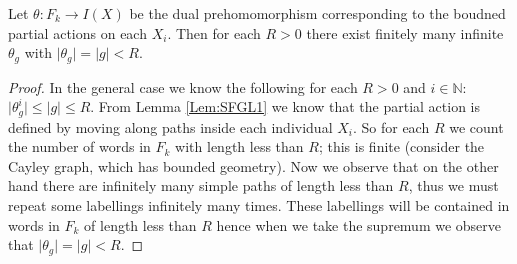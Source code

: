 \begin{proposition}\label{Prop:Inf}
Let $\theta: F_{k} \rightarrow I(X)$ be the dual prehomomorphism corresponding to the boudned partial actions on each $X_{i}$. Then for each $R>0$ there exist finitely many infinite $\theta_{g}$ with $\vert \theta_{g} \vert = \vert g \vert < R$. 
\end{proposition}
\begin{proof}

In the general case we know the following for each $R>0$ and $i \in \mathbb{N}$: $\vert \theta_{g}^{i} \vert \leq \vert g \vert \leq R$. From Lemma \ref{Lem:SFGL1} we know 
that the partial action is defined by moving along paths inside each individual $X_{i}$. So for each $R$ we count the number of words in $F_{k}$ with length less than $R$; this is finite (consider the Cayley graph, which has bounded geometry). Now we observe that on the other hand there are infinitely many simple paths of length less than $R$, thus we must repeat some labellings infinitely many times. These labellings will be contained in words in $F_{k}$ of length less than $R$ hence when we take the supremum we observe that $\vert \theta_{g} \vert = \vert g \vert < R$. \end{proof}

